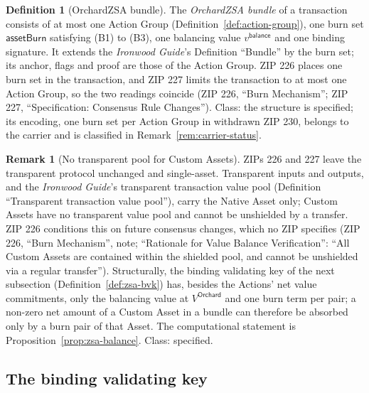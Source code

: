 \documentclass[11pt,a4paper]{article}
\theoremstyle{definition}
\newtheorem{definition}[theorem]{Definition}
\newtheorem{remark}[theorem]{Remark}
\begin{document}
\begin{definition}[OrchardZSA bundle]\label{def:zsa-bundle}
The \emph{OrchardZSA bundle} of a transaction consists of at most one
Action Group (Definition~\ref{def:action-group}), one burn set
$\mathsf{assetBurn}$ satisfying (B1) to (B3), one balancing value
$v^{\mathsf{balance}}$ and one binding signature. It extends the
\emph{Ironwood Guide}'s Definition ``Bundle'' by the burn set; its anchor,
flags and proof are those of the Action Group. ZIP 226 places one burn set
in the transaction, and ZIP 227 limits the transaction to at most one
Action Group, so the two readings coincide (ZIP 226, ``Burn Mechanism'';
ZIP 227, ``Specification: Consensus Rule Changes''). Class: the structure
is specified; its encoding, one burn set per Action Group in withdrawn ZIP
230, belongs to the carrier and is classified in
Remark~\ref{rem:carrier-status}.
\end{definition}

\begin{remark}[No transparent pool for Custom Assets]
\label{rem:no-transparent-asset}
ZIPs 226 and 227 leave the transparent protocol unchanged and single-asset.
Transparent inputs and outputs, and the \emph{Ironwood Guide}'s transparent
transaction value pool (Definition ``Transparent transaction value pool''),
carry the Native Asset only; Custom Assets have no transparent value pool
and cannot be unshielded by a transfer. ZIP 226 conditions this on future
consensus changes, which no ZIP specifies (ZIP 226, ``Burn Mechanism'',
note; ``Rationale for Value Balance Verification'': ``All Custom Assets are
contained within the shielded pool, and cannot be unshielded via a regular
transfer''). Structurally, the binding validating key of the next
subsection (Definition~\ref{def:zsa-bvk}) has, besides the Actions' net
value commitments, only the balancing value at $V^{\mathsf{Orchard}}$ and
one burn term per pair; a non-zero net amount of a Custom Asset in a bundle
can therefore be absorbed only by a burn pair of that Asset. The
computational statement is Proposition~\ref{prop:zsa-balance}. Class:
specified.
\end{remark}

\subsection{The binding validating key}\label{sec:burn-bvk}
\end{document}
